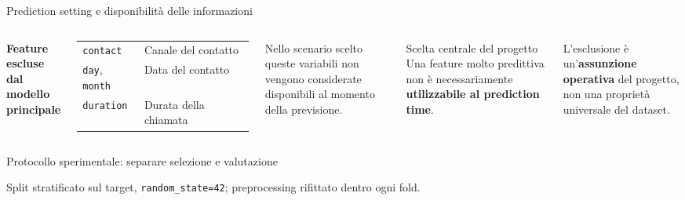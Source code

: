 \documentclass[10pt,aspectratio=169]{beamer}
\begin{document}
\begin{frame}{Prediction setting e disponibilità delle informazioni}
\begin{columns}[T,onlytextwidth]
\textbf{Feature escluse dal modello principale}
\vspace{.45em}
\begin{tabular}{@{}ll@{}}\toprule
\texttt{contact} & Canale del contatto\\
\texttt{day}, \texttt{month} & Data del contatto\\
\texttt{duration} & Durata della chiamata\\\bottomrule\end{tabular}
\par\vspace{.75em}
{\small\noindent\parbox{\linewidth}{Nello scenario scelto queste variabili non vengono considerate disponibili al momento della previsione.}}
\begin{block}{Scelta centrale del progetto}
Una feature molto predittiva non è necessariamente \textbf{utilizzabile al prediction time}.
\end{block}
\vspace{.8em}
{\small L'esclusione è un'\textbf{assunzione operativa} del progetto, non una proprietà universale del dataset.}
\end{columns}
\end{frame}

\begin{frame}{Protocollo sperimentale: separare selezione e valutazione}
\centering
{}
\par\vspace{.15em}
{\footnotesize Split stratificato sul target, \texttt{random\_state=42}; preprocessing rifittato dentro ogni fold.}
\end{frame}
\end{document}
